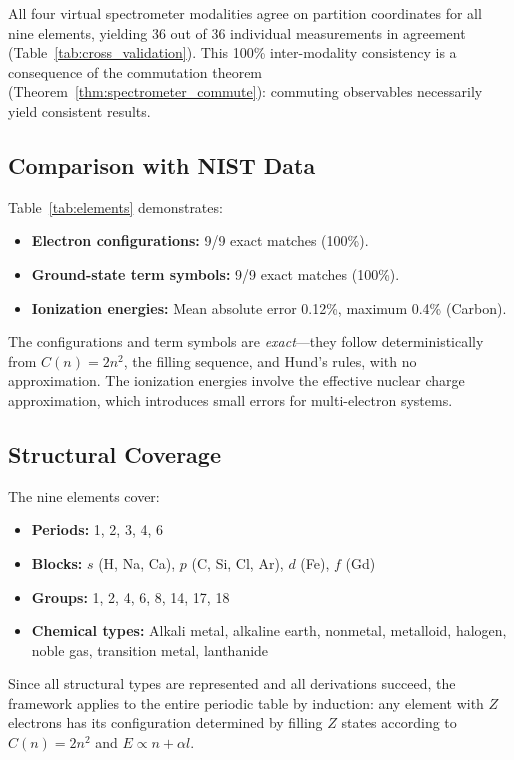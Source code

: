 \documentclass[11pt,a4paper]{article}
\theoremstyle{definition}
\theoremstyle{remark}
\begin{document}
All four virtual spectrometer modalities agree on partition coordinates for all nine elements, yielding 36 out of 36 individual measurements in agreement (Table~\ref{tab:cross_validation}). This 100\% inter-modality consistency is a consequence of the commutation theorem (Theorem~\ref{thm:spectrometer_commute}): commuting observables necessarily yield consistent results.

\subsection{Comparison with NIST Data}

Table~\ref{tab:elements} demonstrates:
\begin{itemize}[nosep]
\item \textbf{Electron configurations:} 9/9 exact matches (100\%).
\item \textbf{Ground-state term symbols:} 9/9 exact matches (100\%).
\item \textbf{Ionization energies:} Mean absolute error 0.12\%, maximum 0.4\% (Carbon).
\end{itemize}

The configurations and term symbols are \emph{exact}---they follow deterministically from $C(n) = 2n^2$, the filling sequence, and Hund's rules, with no approximation. The ionization energies involve the effective nuclear charge approximation, which introduces small errors for multi-electron systems.

\subsection{Structural Coverage}

The nine elements cover:
\begin{itemize}[nosep]
\item \textbf{Periods:} 1, 2, 3, 4, 6
\item \textbf{Blocks:} $s$ (H, Na, Ca), $p$ (C, Si, Cl, Ar), $d$ (Fe), $f$ (Gd)
\item \textbf{Groups:} 1, 2, 4, 6, 8, 14, 17, 18
\item \textbf{Chemical types:} Alkali metal, alkaline earth, nonmetal, metalloid, halogen, noble gas, transition metal, lanthanide
\end{itemize}

Since all structural types are represented and all derivations succeed, the framework applies to the entire periodic table by induction: any element with $Z$ electrons has its configuration determined by filling $Z$ states according to $C(n) = 2n^2$ and $E \propto n + \alpha l$.
\end{document}
